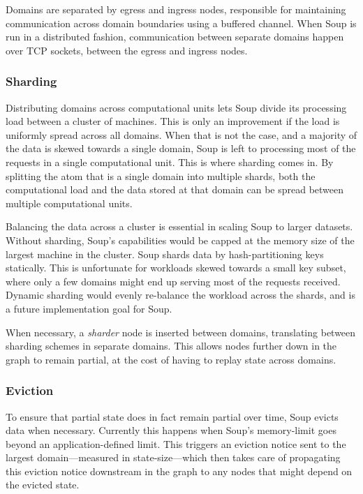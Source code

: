 Domains are separated by egress and ingress nodes, responsible for maintaining
communication across domain boundaries using a buffered channel. When Soup is
run in a distributed fashion, communication between separate domains happen
over TCP sockets, between the egress and ingress nodes.

\subsubsection{Sharding}

Distributing domains across computational units lets Soup divide its processing
load between a cluster of machines. This is only an improvement if the load is
uniformly spread across all domains. When that is not the case, and a majority
of the data is skewed towards a single domain, Soup is left to processing most
of the requests in a single computational unit. This is where sharding comes in.
By splitting the atom that is a single domain into multiple shards, both the
computational load and the data stored at that domain can be spread between
multiple computational units.

Balancing the data across a cluster is essential in scaling Soup to larger
datasets. Without sharding, Soup's capabilities would be capped at the memory
size of the largest machine in the cluster. Soup shards data by
hash-partitioning keys statically. This is unfortunate for workloads skewed
towards a small key subset, where only a few domains might end up serving most
of the requests received. Dynamic sharding would evenly re-balance the workload
across the shards, and is a future implementation goal for Soup.

When necessary, a \textit{sharder} node is inserted between domains, translating
between sharding schemes in separate domains. This allows nodes further down in
the graph to remain partial, at the cost of having to replay state across
domains.


\subsubsection{Eviction}\label{sec:eviction}

To ensure that partial state does in fact remain partial over time, Soup evicts
data when necessary. Currently this happens when Soup's memory-limit goes beyond
an application-defined limit. This triggers an eviction notice sent to the
largest domain---measured in state-size---which then takes care of propagating
this eviction notice downstream in the graph to any nodes that might depend on
the evicted state.

